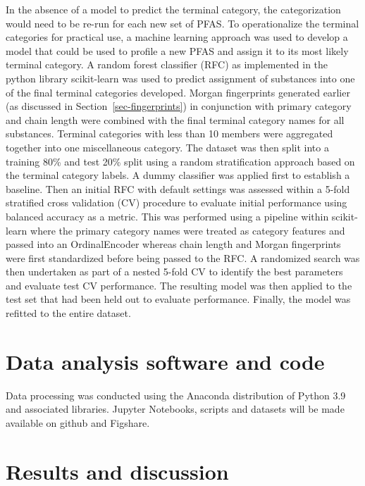 \documentclass[
  super,
  preprint,
  3p]{elsarticle}
\begin{document}
In the absence of a model to predict the terminal category, the
categorization would need to be re-run for each new set of PFAS. To
operationalize the terminal categories for practical use, a machine
learning approach was used to develop a model that could be used to
profile a new PFAS and assign it to its most likely terminal category. A
random forest classifier (RFC) as implemented in the python library
scikit-learn \citep{pedregosa2011} was used to predict assignment of
substances into one of the final terminal categories developed. Morgan
fingerprints generated earlier (as discussed in
Section~\ref{sec-fingerprints}) in conjunction with primary category and
chain length were combined with the final terminal category names for
all substances. Terminal categories with less than 10 members were
aggregated together into one miscellaneous category. The dataset was
then split into a training 80\% and test 20\% split using a random
stratification approach based on the terminal category labels. A dummy
classifier was applied first to establish a baseline. Then an initial
RFC with default settings was assessed within a 5-fold stratified cross
validation (CV) procedure to evaluate initial performance using balanced
accuracy as a metric. This was performed using a pipeline within
scikit-learn where the primary category names were treated as category
features and passed into an OrdinalEncoder whereas chain length and
Morgan fingerprints were first standardized before being passed to the
RFC. A randomized search was then undertaken as part of a nested 5-fold
CV to identify the best parameters and evaluate test CV performance. The
resulting model was then applied to the test set that had been held out
to evaluate performance. Finally, the model was refitted to the entire
dataset.

\hypertarget{sec-code}{%
\section{Data analysis software and code}\label{sec-code}}

Data processing was conducted using the Anaconda distribution of Python
3.9 and associated libraries. Jupyter Notebooks, scripts and datasets
will be made available on github and Figshare.

\hypertarget{results-and-discussion}{%
\section{Results and discussion}\label{results-and-discussion}}
\end{document}
